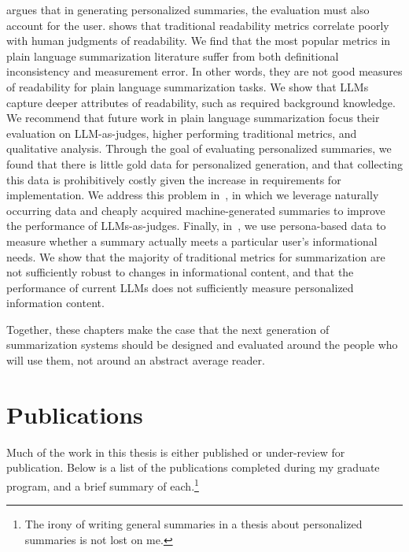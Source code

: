  argues that in generating personalized summaries, the evaluation must also account for the user.  shows that traditional readability metrics correlate poorly with human judgments of readability. We find that the most popular metrics in plain language summarization literature suffer from both definitional inconsistency and measurement error. In other words, they are not good measures of readability for plain language summarization tasks. We show that LLMs capture deeper attributes of readability, such as required background knowledge. We recommend that future work in plain language summarization focus their evaluation on LLM-as-judges, higher performing traditional metrics, and qualitative analysis. Through the goal of evaluating personalized summaries, we found that there is little gold data for personalized generation, and that collecting this data is prohibitively costly given the increase in requirements for implementation. We address this problem in~, in which we leverage naturally occurring data and cheaply acquired machine-generated summaries to improve the performance of LLMs-as-judges. Finally, in~, we use persona-based data to measure whether a summary actually meets a particular user's informational needs. We show that the majority of traditional metrics for summarization are not sufficiently robust to changes in informational content, and that the performance of current LLMs does not sufficiently measure personalized information content.
 
Together, these chapters make the case that the next generation of summarization systems should be designed and evaluated around the people who will use them, not around an abstract average reader.

\section{Publications}

Much of the work in this thesis is either published or under-review for publication. Below is a list of the publications completed during my graduate program, and a brief summary of each.\footnote{The irony of writing general summaries in a thesis about personalized summaries is not lost on me.}

